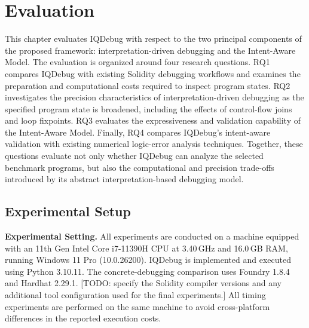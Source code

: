 \documentclass[11pt,oneside]{report}
\theoremstyle{plain}
\theoremstyle{definition}
\theoremstyle{remark}
\begin{document}
\chapter{Evaluation}\label{chap:eval}

This chapter evaluates IQDebug with respect to the two principal components of the proposed framework: interpretation-driven debugging and the Intent-Aware Model.
The evaluation is organized around four research questions.
RQ1 compares IQDebug with existing Solidity debugging workflows and examines the preparation and computational costs required to inspect program states.
RQ2 investigates the precision characteristics of interpretation-driven debugging as the specified program state is broadened, including the effects of control-flow joins and loop fixpoints.
RQ3 evaluates the expressiveness and validation capability of the Intent-Aware Model.
Finally, RQ4 compares IQDebug's intent-aware validation with existing numerical logic-error analysis techniques.
Together, these questions evaluate not only whether IQDebug can analyze the selected benchmark programs, but also the computational and precision trade-offs introduced by its abstract interpretation-based debugging model.

\section{Experimental Setup}\label{sec:eval:setup}

\noindent\textbf{Experimental Setting.}
All experiments are conducted on a machine equipped with an 11th Gen Intel\textregistered{} Core\texttrademark{} i7-11390H CPU at 3.40\,GHz and 16.0\,GB RAM, running Windows 11 Pro (10.0.26200).
IQDebug is implemented and executed using Python 3.10.11.
The concrete-debugging comparison uses Foundry 1.8.4 and Hardhat 2.29.1.
[TODO: specify the Solidity compiler versions and any additional tool configuration used for the final experiments.]
All timing experiments are performed on the same machine to avoid cross-platform differences in the reported execution costs.
\end{document}
